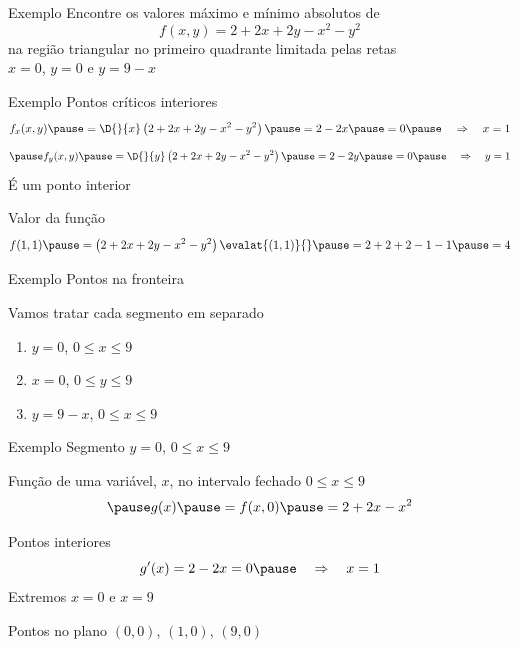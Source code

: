 \addtocounter{exemplo}{1}
\begin{frame}{Exemplo \theexemplo}
  Encontre os valores máximo e mínimo absolutos de
  \[
    f(x, y) = 2 + 2x + 2y - x^2 - y^2
  \]
  na região triangular no primeiro quadrante limitada pelas retas \\
  \(x=0\), \(y=0\) e \(y = 9-x\)
\end{frame}

\begin{frame}{Exemplo \theexemplo}
  Pontos críticos interiores
  \[
    f_x(x, y)
    \pause
    = \D{}{x}\left(2 + 2x + 2y - x^2 - y^2\right)
    \pause
    = 2-2x
    \pause
    = 0
    \pause
    \quad\Rightarrow\quad
    x = 1
  \]
  \[
    \pause
    f_y(x, y)
    \pause
    = \D{}{y}\left(2 + 2x + 2y - x^2 - y^2\right)
    \pause
    = 2-2y
    \pause
    = 0
    \pause
    \quad\Rightarrow\quad
    y = 1
  \]
  \pause
  É um ponto interior

  \pause
  \vspace{\baselineskip}
  Valor da função
  \[
    f(1, 1)
    \pause
    = \left(2 + 2x + 2y - x^2 - y^2\right)\evalat{(1, 1)}{}
    \pause
    = 2 + 2 + 2 - 1 - 1
    \pause
    = 4
  \]
\end{frame}

\begin{frame}{Exemplo \theexemplo}
  Pontos na fronteira

  \pause
  \vspace{\baselineskip}
  Vamos tratar cada segmento em separado
  \begin{enumerate}[<+->]
    \item \(y=0\), \(0\leq x\leq 9\)
    \item \(x=0\), \(0\leq y\leq 9\)
    \item \(y=9-x\), \(0\leq x\leq 9\)
  \end{enumerate}
\end{frame}

\begin{frame}{Exemplo \theexemplo}
  Segmento \(y=0\), \(0\leq x\leq 9\)

  \pause
  \vspace{\baselineskip}
  Função de uma variável, $x$, no intervalo fechado \(0\leq x\leq 9\)
  \[
    \pause
    g(x)
    \pause
    = f(x, 0)
    \pause
    = 2 + 2x - x^2
  \]

  \pause
  \vspace{0.3\baselineskip}
  Pontos interiores
  \[
    g'(x) = 2 - 2x = 0
    \pause
    \quad\Rightarrow\quad
    x = 1
  \]
  \pause
  Extremos \(x=0\) e \(x=9\)

  \pause
  \vspace{0.5\baselineskip}
  Pontos no plano
  \((0, 0)\), \((1, 0)\), \((9, 0)\)
\end{frame}

